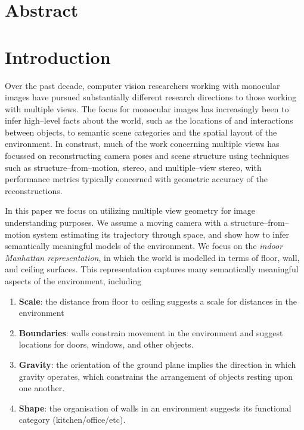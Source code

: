 \documentclass{article}
\newcommand*\initfamily{\usefont{U}{GotIn}{xl}{n}}
\begin{document}
\section{Abstract}

\section{Introduction}

\initfamily
\fontsize{50}{60}
\selectfont
O\fontsize{10}{12}\normalfont ver the past decade, computer vision researchers working with
monocular images have pursued substantially different research
directions to those working with multiple views. The focus for
monocular images has increasingly been to infer high--level facts
about the world, such as the locations of and interactions between
objects, to semantic scene categories and the spatial layout of the
environment. In constrast, much of the work concerning multiple views
has focussed on reconstructing camera poses and scene structure using
techniques such as structure--from--motion, stereo, and multiple--view
stereo, with performance metrics typically concerned with geometric
accuracy of the reconstructions.

In this paper we focus on utilizing multiple view geometry for image
understanding purposes. We assume a moving camera with a
structure--from--motion system estimating its trajectory through
space, and show how to infer semantically meaningful models of the
environment. We focus on the \textit{indoor Manhattan
  representation}\cite{Lee09}, in which the world is modelled
in terms of floor, wall, and ceiling surfaces. This representation
captures many semantically meaningful aspects of the environment,
including
\begin{enumerate}
  \item{\textbf{Scale}: the distance from floor to ceiling suggests
    a scale for distances in the environment}
  \item{\textbf{Boundaries}: walls constrain movement in the
    environment and suggest locations for doors, windows, and other
    objects.}
  \item{\textbf{Gravity}: the orientation of the ground plane implies
    the direction in which gravity operates, which constrains the
    arrangement of objects resting upon one another.}
  \item{\textbf{Shape}: the organisation of walls in an environment
    suggests its functional category (kitchen/office/etc).}
\end{enumerate}
\end{document}
